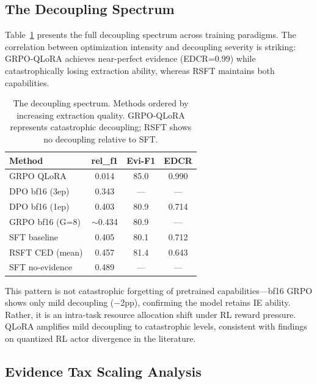 \documentclass[11pt,a4paper]{article}
\begin{document}
\subsection{The Decoupling Spectrum}

Table~\ref{tab:spectrum} presents the full decoupling spectrum across training paradigms. The correlation between optimization intensity and decoupling severity is striking: GRPO-QLoRA achieves near-perfect evidence (EDCR=0.99) while catastrophically losing extraction ability, whereas RSFT maintains both capabilities.

\begin{table}[t]
\centering
\small
\begin{tabular}{lccc}
\toprule
\textbf{Method} & \textbf{rel\_f1} & \textbf{Evi-F1} & \textbf{EDCR} \\
\midrule
GRPO QLoRA & 0.014 & 85.0 & 0.990 \\
DPO bf16 (3ep) & 0.343 & --- & --- \\
DPO bf16 (1ep) & 0.403 & 80.9 & 0.714 \\
GRPO bf16 (G=8) & $\sim$0.434 & 80.9 & --- \\
SFT baseline & 0.405 & 80.1 & 0.712 \\
RSFT CED (mean) & 0.457 & 81.4 & 0.643 \\
SFT no-evidence & 0.489 & --- & --- \\
\bottomrule
\end{tabular}
\caption{The decoupling spectrum. Methods ordered by increasing extraction quality. GRPO-QLoRA represents catastrophic decoupling; RSFT shows no decoupling relative to SFT.}
\label{tab:spectrum}
\end{table}

This pattern is not catastrophic forgetting of pretrained capabilities---bf16 GRPO shows only mild decoupling ($-$2pp), confirming the model retains IE ability. Rather, it is an intra-task resource allocation shift under RL reward pressure. QLoRA amplifies mild decoupling to catastrophic levels, consistent with findings on quantized RL actor divergence in the literature.

\subsection{Evidence Tax Scaling Analysis}
\end{document}
